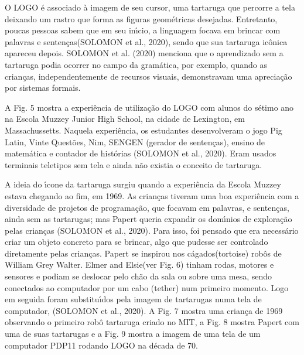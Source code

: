 \documentclass[
12pt,		%
openright,	%
twoside,  %
a4paper,			%
chapter=TITLE,		%
english,			%
french,				%
spanish,			%
brazil				%
]{USPSC-classe/USPSC}
\begin{document}
O LOGO \'e associado \`a imagem de seu cursor, uma tartaruga que percorre a tela deixando um rastro que forma as figuras geom\'etricas desejadas. Entretanto, poucas pessoas sabem que em seu in\'{\i}cio, a linguagem \textquotedbl focava em brincar com palavras e senten\c{c}as\textquotedbl  (SOLOMON et al., 2020), sendo que sua tartaruga \textquotedbl  ic\^onica \textquotedbl  apareceu depois.  SOLOMON et al. (2020) menciona que o aprendizado sem a tartaruga podia ocorrer no campo da gram\'atica, por exemplo, quando as crian\c{c}as, independentemente de recursos visuais, demonstravam uma aprecia\c{c}\~ao por sistemas formais.








A Fig. 5 mostra a experi\^encia de utiliza\c{c}\~ao do LOGO com alunos do s\'etimo ano na Escola Muzzey Junior High School, na cidade de Lexington, em Massachussetts. Naquela experi\^encia, os estudantes desenvolveram o jogo Pig Latin, Vinte Quest\~oes, Nim, SENGEN (gerador de senten\c{c}as), ensino de matem\'atica e contador de hist\'orias  (SOLOMON et al., 2020). Eram usados terminais teletipos sem tela e ainda n\~ao existia o conceito de tartaruga.








A ideia do \'{\i}cone da tartaruga surgiu quando a experi\^encia da Escola Muzzey estava chegando ao fim, em 1969. As crian\c{c}as tiveram uma boa experi\^encia com a diversidade de projetos de programa\c{c}\~ao, que focavam em palavras, e senten\c{c}as, ainda sem as tartarugas; mas Papert queria expandir os dom\'{\i}nios de explora\c{c}\~ao pelas crian\c{c}as (SOLOMON et al., 2020). Para isso, foi pensado que era necess\'ario criar um objeto concreto para se brincar, algo que pudesse ser controlado diretamente pelas crian\c{c}as. Papert se inspirou nos \textquotedbl c\'agados\textquotedbl   (tortoise) rob\^os de William Grey Walter. \textquotedbl Elmer and Elsie\textquotedbl  (ver Fig. 6) tinham rodas, motores e sensores e podiam se deslocar pelo ch\~ao da sala ou sobre uma mesa, sendo conectados ao computador por um cabo (tether) num primeiro momento. Logo em seguida foram substitu\'{\i}dos pela imagem de tartarugas numa tela de computador, (SOLOMON et al., 2020). A Fig. 7 mostra uma crian\c{c}a de 1969 observando o primeiro rob\^o tartaruga criado no MIT, a Fig. 8 mostra Papert com uma de suas tartarugas e a Fig. 9 mostra a imagem de uma tela de um computador PDP11 rodando LOGO na d\'ecada de 70.
\end{document}
